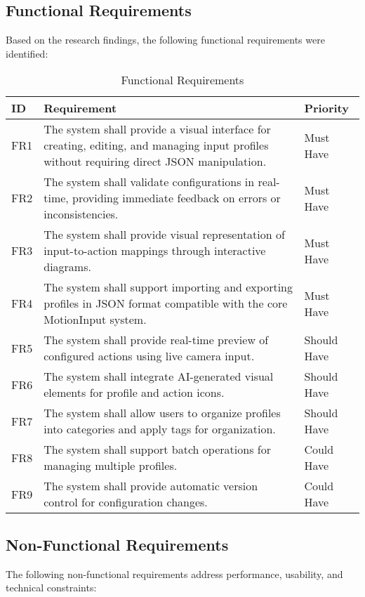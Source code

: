 \subsection{Functional Requirements}
Based on the research findings, the following functional requirements were identified:

\begin{table}[h]
\centering
\begin{tabular}{|p{1cm}|p{7cm}|p{3cm}|}
\hline
\textbf{ID} & \textbf{Requirement} & \textbf{Priority} \\
\hline
FR1 & The system shall provide a visual interface for creating, editing, and managing input profiles without requiring direct JSON manipulation. & Must Have \\
\hline
FR2 & The system shall validate configurations in real-time, providing immediate feedback on errors or inconsistencies. & Must Have \\
\hline
FR3 & The system shall provide visual representation of input-to-action mappings through interactive diagrams. & Must Have \\
\hline
FR4 & The system shall support importing and exporting profiles in JSON format compatible with the core MotionInput system. & Must Have \\
\hline
FR5 & The system shall provide real-time preview of configured actions using live camera input. & Should Have \\
\hline
FR6 & The system shall integrate AI-generated visual elements for profile and action icons. & Should Have \\
\hline
FR7 & The system shall allow users to organize profiles into categories and apply tags for organization. & Should Have \\
\hline
FR8 & The system shall support batch operations for managing multiple profiles. & Could Have \\
\hline
FR9 & The system shall provide automatic version control for configuration changes. & Could Have \\
\hline
\end{tabular}
\caption{Functional Requirements}
\label{tab:functional_requirements}
\end{table}

\subsection{Non-Functional Requirements}
The following non-functional requirements address performance, usability, and technical constraints:

